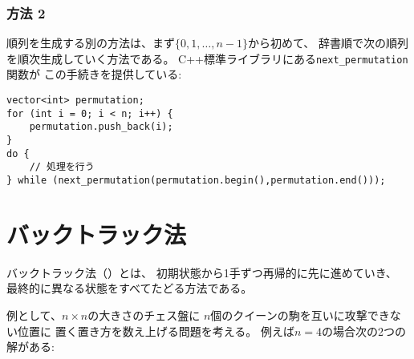 \subsubsection{方法 2}


順列を生成する別の方法は、まず$\{0,1,\ldots,n-1\}$から初めて、
辞書順で次の順列を順次生成していく方法である。
C++標準ライブラリにある\texttt{next\_permutation}関数が
この手続きを提供している:

\begin{lstlisting}
vector<int> permutation;
for (int i = 0; i < n; i++) {
    permutation.push_back(i);
}
do {
    // 処理を行う
} while (next_permutation(permutation.begin(),permutation.end()));
\end{lstlisting}

\begin{comment}
\section{Backtracking}

\index{backtracking}

A \key{backtracking} algorithm
begins with an empty solution
and extends the solution step by step.
The search recursively
goes through all different ways how
a solution can be constructed.
\end{comment}

\section{バックトラック法}


バックトラック法（）とは、
初期状態から1手ずつ再帰的に先に進めていき、
最終的に異なる状態をすべてたどる方法である。

\begin{comment}
\index{queen problem}

As an example, consider the problem of
calculating the number
of ways $n$ queens can be placed on
an $n \times n$ chessboard so that
no two queens attack each other.
For example, when $n=4$,
there are two possible solutions:
\end{comment}


例として、$n \times n$の大きさのチェス盤に
$n$個のクイーンの駒を互いに攻撃できない位置に
置く置き方を数え上げる問題を考える。
例えば$n=4$の場合次の2つの解がある:

